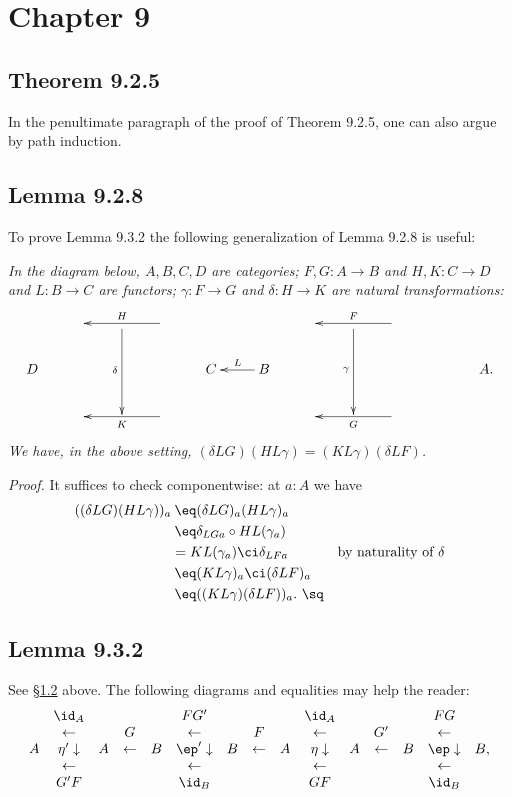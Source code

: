 \documentclass[12pt]{article}
\begin{document}

\section{Chapter 9}

\subsection{Theorem 9.2.5}

In the penultimate paragraph of the proof of Theorem 9.2.5, one can also argue by path induction.


\subsection{Lemma 9.2.8}\label{928}

To prove Lemma 9.3.2 the following generalization of Lemma 9.2.8 is useful:

\nn\emph{In the diagram below, $A,B,C,D$ are categories; $F,G:A\to B$ and $H,K:C\to D$ and $L:B\to C$ are functors; $\gamma:F\to G$ and $\delta:H\to K$ are natural transformations:
$$
\xymatrix{
&&\ar[dd]_\delta&\ar[ll]_H&&&&\ar[dd]_\gamma&\ar[ll]_F\\
D&&&&C&B\ar[l]_L&&&&&A.\\
&&&\ar[ll]^K&&&&&\ar[ll]^G}
$$ 
We have, in the above setting, $(\delta LG)(HL\gamma)=(KL\gamma)(\delta LF)$.}

\nn\emph{Proof.} It suffices to check componentwise: at $a:A$ we have
\begin{align*}
((\delta LG)(HL\gamma))_a
&\:\eq(\delta LG)_{a}(HL\gamma)_a\\
&\:\eq\delta_{LGa}\circ HL(\gamma_a)\\
&= KL(\gamma_a)\ci\delta_{LFa}&\text{by naturality of $\delta$}\\
&\:\eq(KL\gamma)_a\ci(\delta LF)_a\\
&\:\eq((KL\gamma)(\delta LF))_a.\ \sq
\end{align*}


\subsection{Lemma 9.3.2}

See \S\ref{928} above. The following diagrams and equalities may help the reader:
$$
\begin{array}{ccccccccccccccc}
&\id_A&&&&FG'&&&&\id_A&&&&FG\\
&\leftarrow&&G&&\leftarrow&&F&&\leftarrow&&G'&&\leftarrow\\
A&\eta'\downarrow&A&\leftarrow&B&\ep'\downarrow&B&\leftarrow&A&\eta\downarrow&A&\leftarrow&B&\ep\downarrow&B,\\
&\leftarrow&&&&\leftarrow&&&&\leftarrow&&&&\leftarrow\\
&G'F&&&&\id_B&&&&GF&&&&\id_B
\end{array}
$$ 
\end{document}
